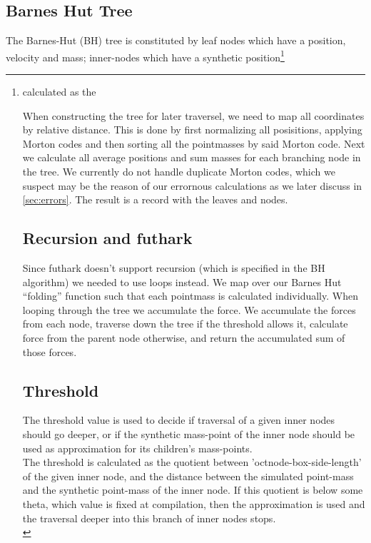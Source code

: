 \subsection{Barnes Hut Tree}
The Barnes-Hut (BH) tree is constituted by leaf nodes which have a position, velocity and mass; inner-nodes which have a synthetic position\footnote{calculated as the  


When constructing the tree for later traversel, we need to map all coordinates
by relative distance. This is done by first normalizing all posisitions,
applying Morton codes and then sorting all the pointmasses by said Morton code.
Next we calculate all average positions and sum masses for each branching node
in the tree. We currently do not handle duplicate Morton codes, which we suspect
may be the reason of our errornous calculations as we later discuss in
\autoref{sec:errors}. The result is a record with the leaves and nodes.

\subsection{Recursion and futhark}
Since futhark doesn't support recursion (which is specified in the BH algorithm)
we needed to use loops instead. We map over our Barnes Hut ``folding'' function
such that each pointmass is calculated individually. When looping through the
tree we accumulate the force. We accumulate the forces from each node, traverse
down the tree if the threshold allows it, calculate force from the parent node
otherwise, and return the accumulated sum of those forces.

\subsection{Threshold}
The threshold value is used to decide if traversal of a given inner nodes should go
deeper, or if the synthetic mass-point of the inner node should be used as
approximation for its children's mass-points. \\


The threshold is calculated as the quotient between 'octnode-box-side-length' of
the given inner node, and the distance between the simulated point-mass and the
synthetic point-mass of the inner node. If this quotient is below some theta,
which value is fixed at compilation, then the approximation is used and the
traversal deeper into this branch of inner nodes stops. \\

}
